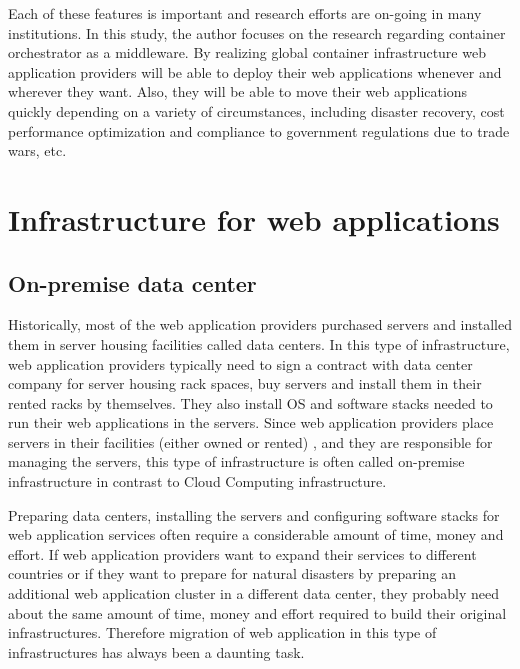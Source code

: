 Each of these features is important\added{,} and research efforts are on-going in many institutions.
In this study, the author focuses on the research regarding container orchestrator as a  middleware.
%
By realizing global container infrastructure  web application providers will be able to deploy their web applications whenever and wherever they want.
Also, they will be able to move their web applications quickly depending on a variety of circumstances, including disaster recovery, cost performance optimization\added{,} and compliance to government regulations due to trade wars, etc.


\section{Infrastructure for web applications}

\subsection{On-premise data center}

Historically, most of the web application providers purchased servers and installed them in server housing facilities called data centers.
In this type of infrastructure, web application providers typically need to sign a contract with data center company for server housing rack spaces, buy servers and install them in their rented racks by themselves.
They also install OS and software stacks needed to run their web applications in the servers.
Since web application providers place servers in their facilities (either owned or rented) , and they are responsible for managing the servers, this type of infrastructure is often called on-premise infrastructure in contrast to Cloud Computing infrastructure.

Preparing data centers, installing the servers and configuring software stacks for web application services often require a considerable amount of time, money and effort.
If web application providers want to expand their services to different countries or if they want to prepare for natural disasters by preparing an additional web application cluster in a different data center, they probably need about the same amount of time, money and effort required to build their original infrastructures.
Therefore migration of web application in this type of infrastructures has always been a daunting task.

